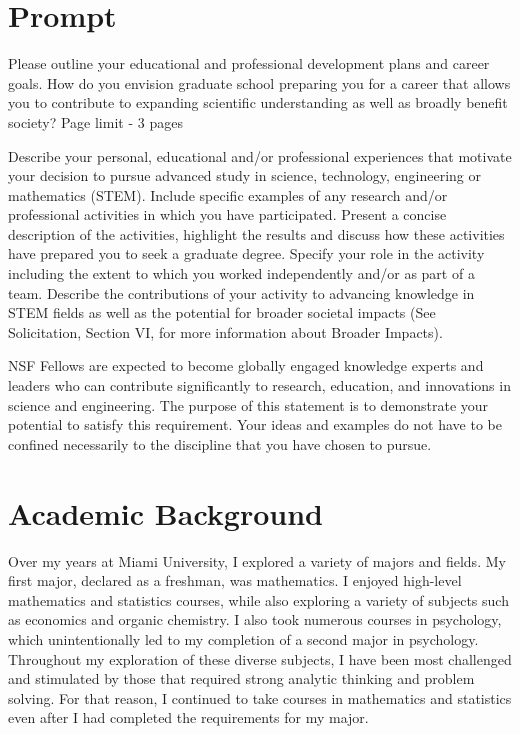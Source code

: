 \documentclass[12pt]{article}
\begin{document}
\section*{Prompt}
Please outline your educational and professional development plans and career goals. How do you envision graduate school preparing you for a career that allows you to contribute to expanding scientific understanding as well as broadly benefit society? Page limit - 3 pages 

Describe your personal, educational and/or professional experiences that motivate your decision to pursue advanced study in science, technology, engineering or mathematics (STEM). Include specific examples of any research and/or professional activities in which you have participated. Present a concise description of the activities, highlight the results and discuss how these activities have prepared you to seek a graduate degree. Specify your role in the activity including the extent to which you worked independently and/or as part of a team. Describe the contributions of your activity to advancing knowledge in STEM fields as well as the potential for broader societal impacts (See Solicitation, Section VI, for more information about Broader Impacts). 

NSF Fellows are expected to become globally engaged knowledge experts and leaders who can contribute significantly to research, education, and innovations in science and engineering. The purpose of this statement is to demonstrate your potential to satisfy this requirement. Your ideas and examples do not have to be confined necessarily to the discipline that you have chosen to pursue.

\clearpage
\section*{Academic Background}
Over my years at Miami University, I explored a variety of majors and fields. My first major, declared as a freshman, was mathematics. I enjoyed high-level mathematics and statistics courses, while also exploring a variety of subjects such as economics and organic chemistry. I also took numerous courses in psychology, which unintentionally led to my completion of a second major in psychology. Throughout my exploration of these diverse subjects, I have been most challenged and stimulated by those that required strong analytic thinking and problem solving. For that reason, I continued to take courses in mathematics and statistics even after I had completed the requirements for my major.
\end{document}
